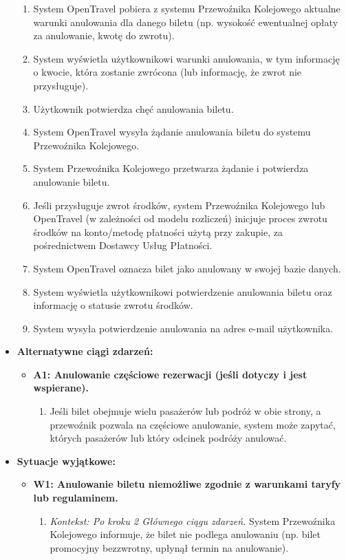 \documentclass[a4paper,12pt]{article}
\begin{document}
\begin{itemize}
\begin{enumerate}
\item System OpenTravel pobiera z systemu Przewoźnika Kolejowego aktualne warunki anulowania dla danego biletu (np. wysokość ewentualnej opłaty za anulowanie, kwotę do zwrotu).
\item System wyświetla użytkownikowi warunki anulowania, w tym informację o kwocie, która zostanie zwrócona (lub informację, że zwrot nie przysługuje).
\item Użytkownik potwierdza chęć anulowania biletu.
\item System OpenTravel wysyła żądanie anulowania biletu do systemu Przewoźnika Kolejowego.
\item System Przewoźnika Kolejowego przetwarza żądanie i potwierdza anulowanie biletu.
\item Jeśli przysługuje zwrot środków, system Przewoźnika Kolejowego lub OpenTravel (w zależności od modelu rozliczeń) inicjuje proces zwrotu środków na konto/metodę płatności użytą przy zakupie, za pośrednictwem Dostawcy Usług Płatności.
\item System OpenTravel oznacza bilet jako anulowany w swojej bazie danych.
\item System wyświetla użytkownikowi potwierdzenie anulowania biletu oraz informację o statusie zwrotu środków.
\item System wysyła potwierdzenie anulowania na adres e-mail użytkownika.
\end{enumerate}
\item \textbf{Alternatywne ciągi zdarzeń:}
\begin{itemize}
\item \textbf{A1: Anulowanie częściowe rezerwacji (jeśli dotyczy i jest wspierane).}
\begin{enumerate}
\item Jeśli bilet obejmuje wielu pasażerów lub podróż w obie strony, a przewoźnik pozwala na częściowe anulowanie, system może zapytać, których pasażerów lub który odcinek podróży anulować.
\end{enumerate}
\end{itemize}
\item \textbf{Sytuacje wyjątkowe:}
\begin{itemize}
\item \textbf{W1: Anulowanie biletu niemożliwe zgodnie z warunkami taryfy lub regulaminem.}
\begin{enumerate}
\item \textit{Kontekst: Po kroku 2 Głównego ciągu zdarzeń.} System Przewoźnika Kolejowego informuje, że bilet nie podlega anulowaniu (np. bilet promocyjny bezzwrotny, upłynął termin na anulowanie).

\end{enumerate}
\end{itemize}
\end{itemize}
\end{document}
